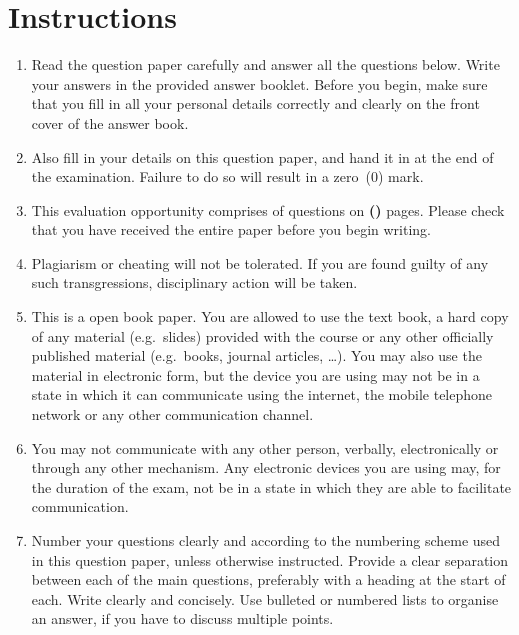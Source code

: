 
\section*{Instructions}
\begin{enumerate}
	\item Read the question paper carefully and answer all the questions below. Write your answers in the provided answer booklet. Before you begin, make sure that you fill in all your personal details correctly and clearly on the front cover of the answer book.
	
	\item Also fill in your details on this question paper, and hand it in at the end of the examination. Failure to do so will result in a zero~(0) mark.
	
	\item This evaluation opportunity comprises of \textbf{\numquestions} questions on \textbf{(\numpages)} pages. Please check that you have received the entire paper before you begin writing.
	      
	\item Plagiarism or cheating will not be tolerated. If you are found guilty of any such transgressions, disciplinary action will be taken.
	
	\item This is a open book paper. You are allowed to use the text book, a hard copy of any material (e.g.\ slides) provided with the course or any other officially published material (e.g.\ books, journal articles, \ldots). You may also use the material in electronic form, but the device you are using may not be in a state in which it can communicate using the internet, the mobile telephone network or any other communication channel.
	
	\item You may not communicate with any other person, verbally, electronically or through any other mechanism. Any electronic devices you are using may, for the duration of the exam, not be in a state in which they are able to facilitate communication. 
	
	\item Number your questions clearly and according to the numbering scheme used in this question paper, unless otherwise instructed. Provide a clear separation between each of the main questions, preferably with a heading at the start of each. Write clearly and concisely. Use bulleted or numbered lists to organise an answer, if you have to discuss multiple points. 
\end{enumerate}
